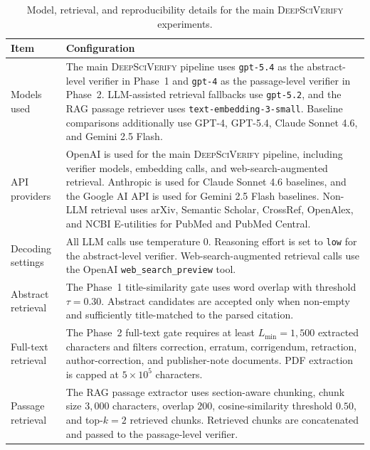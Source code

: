 \documentclass{article}
\theoremstyle{plain}
\theoremstyle{definition}
\theoremstyle{remark}
\begin{document}
\begin{table}[t]
\centering
\caption{Model, retrieval, and reproducibility details for the main \textsc{DeepSciVerify} experiments.}
\label{tab:repro}
\renewcommand{\arraystretch}{1.2}
\small
\begin{tabular}{p{}p{}}
\toprule
\textbf{Item} & \textbf{Configuration} \\
\midrule

Models used &
The main \textsc{DeepSciVerify} pipeline uses \texttt{gpt-5.4} as the abstract-level verifier in Phase~1 and \texttt{gpt-4} as the passage-level verifier in Phase~2. LLM-assisted retrieval fallbacks use \texttt{gpt-5.2}, and the RAG passage retriever uses \texttt{text-embedding-3-small}. Baseline comparisons additionally use GPT-4, GPT-5.4, Claude Sonnet 4.6, and Gemini 2.5 Flash. \\

\addlinespace[2pt]
API providers &
OpenAI is used for the main \textsc{DeepSciVerify} pipeline, including verifier models, embedding calls, and web-search-augmented retrieval. Anthropic is used for Claude Sonnet 4.6 baselines, and the Google AI API is used for Gemini 2.5 Flash baselines. Non-LLM retrieval uses arXiv, Semantic Scholar, CrossRef, OpenAlex, and NCBI E-utilities for PubMed and PubMed Central. \\

\addlinespace[2pt]
Decoding settings &
All LLM calls use temperature $0$. Reasoning effort is set to \texttt{low} for the abstract-level verifier. Web-search-augmented retrieval calls use the OpenAI \texttt{web\_search\_preview} tool. \\

\addlinespace[2pt]
Abstract retrieval &
The Phase~1 title-similarity gate uses word overlap with threshold $\tau=0.30$. Abstract candidates are accepted only when non-empty and sufficiently title-matched to the parsed citation. \\

\addlinespace[2pt]
Full-text retrieval &
The Phase~2 full-text gate requires at least $L_{\min}=1{,}500$ extracted characters and filters correction, erratum, corrigendum, retraction, author-correction, and publisher-note documents. PDF extraction is capped at $5\times10^{5}$ characters. \\

\addlinespace[2pt]
Passage retrieval &
The RAG passage extractor uses section-aware chunking, chunk size $3{,}000$ characters, overlap $200$, cosine-similarity threshold $0.50$, and top-$k=2$ retrieved chunks. Retrieved chunks are concatenated and passed to the passage-level verifier. \\


\end{tabular}
\end{table}
\end{document}
